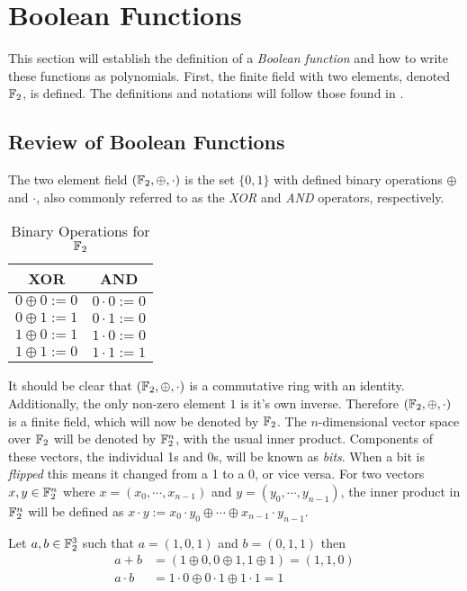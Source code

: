 \section{Boolean Functions}
\par This section will establish the definition of a {\em Boolean function}
and how to write these functions as polynomials. First, the finite field
with two elements, denoted $\mathbb{F}_2$, is defined. The definitions and
notations will follow those found in \cite{bk:cs09}.

\subsection{Review of Boolean Functions}
\par The two element field $(\mathbb{F}_2,\oplus,\cdot)$ is the set $\{0,1\}$
with defined binary operations $\oplus$ and $\cdot$, also commonly referred
to as the {\em XOR} and {\em AND} operators, respectively.
\begin{table}[h!]\label{tab:GF(2)}
	\centering
	\begin{tabular}{|c|c|}
		\hline
		XOR&AND\\
		\hline
		$0\oplus0:=0$&$0\cdot0:=0$\\
		$0\oplus1:=1$&$0\cdot1:=0$\\
		$1\oplus0:=1$&$1\cdot0:=0$\\
		$1\oplus1:=0$&$1\cdot1:=1$\\
		\hline
	\end{tabular}
	\caption{Binary Operations for $\mathbb{F}_2$}
\end{table}
\par It should be clear that $(\mathbb{F}_2,\oplus,\cdot)$ is a commutative ring
with an identity. Additionally, the only non-zero element $1$ is it's own
inverse. Therefore $(\mathbb{F}_2,\oplus,\cdot)$ is a finite field, which will now
be denoted by $\mathbb{F}_2$. The $n$-dimensional vector space over $\mathbb{F}_2$ will
be denoted by $\mathbb{F}_2^n$, with the usual inner product. Components of these
vectors, the individual 1s and 0s, will be known as {\em bits}. When a bit
is {\em flipped} this means it changed from a 1 to a 0, or vice versa.
For two vectors $x,y\in\mathbb{F}_2^n$ where $x=(x_0,\cdots,x_{n-1})$ and
$y=(y_0,\cdots,y_{n-1})$, the inner product in $\mathbb{F}_2^n$ will be defined
as $x\cdot y:=\allowbreak x_0\cdot y_0 \oplus\allowbreak
\cdots \oplus\allowbreak x_{n-1}\cdot y_{n-1}$.

\begin{example}
	Let $a,b\in\mathbb{F}_2^3$ such that $a=(1,0,1)$ and $b=(0,1,1)$ then
	\begin{align*}
		a+b      &=(1\oplus0,0\oplus1,1\oplus1)=(1,1,0) \\
		a\cdot b &=1\cdot0\oplus0\cdot1\oplus1\cdot1=1
	\end{align*}
\end{example}

